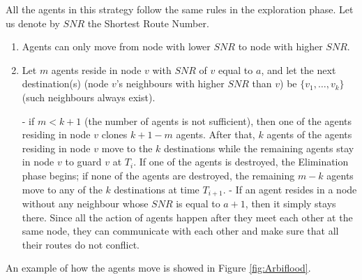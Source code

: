 All the agents in this strategy follow the same rules in the exploration phase.
Let us denote by $SNR$ the Shortest Route Number.
\begin{enumerate}
\item Agents can only move from node with lower $SNR$ to node with higher $SNR$.
\item Let  $m$ agents reside in node $v$ with   $SNR$ of $v$ equal to $a$, and let  the next destination(s) (node $v$'s neighbours with higher $SNR$ than $v$) be $\{v_1,\ldots, v_k\}$  (such   neighbours always exist).

- if $m<k+1$ (the number of agents is not sufficient), then one of the agents residing in node $v$ clones $k+1-m$ agents. After that, $k$ agents of the agents residing in node $v$ move to the $k$ destinations while the remaining agents stay in node $v$ to guard $v$ at $T_i$. 
 If one of the agents is destroyed, the Elimination phase begins; if none of the agents are destroyed, the remaining $m-k$ agents %
move to any of the $k$ destinations at  time $T_{i+1}$. 
- If an agent resides in a node without any neighbour whose $SNR$ is equal to $a+1$, then it simply stays there.
        Since all the action of agents happen after they meet each other at the same node, they can communicate with each other and make sure that all their routes do not conflict.
% 
\end{enumerate}
An example of how the agents move is showed in Figure \ref{fig:Arbiflood}.
